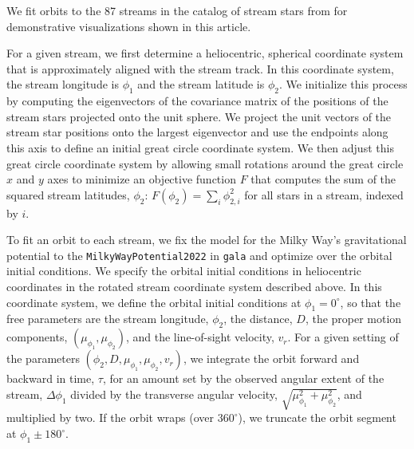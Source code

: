 \documentclass[final,5p,times,twocolumn,authoryear]{elsarticle}
\begin{document}
%

We fit orbits to the 87 streams in the catalog of stream stars from \citet{ibata:2023}
for demonstrative visualizations shown in this article.

For a given stream, we first determine a heliocentric, spherical coordinate system that
is approximately aligned with the stream track.
In this coordinate system, the stream longitude is $\phi_1$ and the stream latitude is
$\phi_2$.
We initialize this process by computing the eigenvectors of the covariance matrix of the
positions of the stream stars projected onto the unit sphere.
We project the unit vectors of the stream star positions onto the largest eigenvector
and use the endpoints along this axis to define an initial great circle coordinate
system.
We then adjust this great circle coordinate system by allowing small rotations around
the great circle $x$ and $y$ axes to minimize an objective function $F$ that computes
the sum of the squared stream latitudes, $\phi_2$: $F(\phi_2) = \sum_i \phi_{2,i}^2$ for
all stars in a stream, indexed by $i$.

To fit an orbit to each stream, we fix the model for the Milky Way's gravitational
potential to the \texttt{MilkyWayPotential2022} in \texttt{gala}
\citep{price-whelan:2017} and optimize over the orbital initial conditions.
We specify the orbital initial conditions in heliocentric coordinates in the rotated
stream coordinate system described above.
In this coordinate system, we define the orbital initial conditions at $\phi_1=0^\circ$,
so that the free parameters are the stream longitude, $\phi_2$, the distance, $D$, the
proper motion components, $(\mu_{\phi_1}, \mu_{\phi_2})$, and the line-of-sight
velocity, $v_r$.
For a given setting of the parameters $(\phi_2, D, \mu_{\phi_1}, \mu_{\phi_2}, v_r)$, we
integrate the orbit forward and backward in time, $\tau$, for an amount set by the
observed angular extent of the stream, $\Delta \phi_1$ divided by the transverse angular
velocity, $\sqrt{\mu_{\phi_1}^2 + \mu_{\phi_2}^2}$, and multiplied by two.
If the orbit wraps (over $360^\circ$), we truncate the orbit segment at $\phi_1 \pm
180^\circ$.
\end{document}
